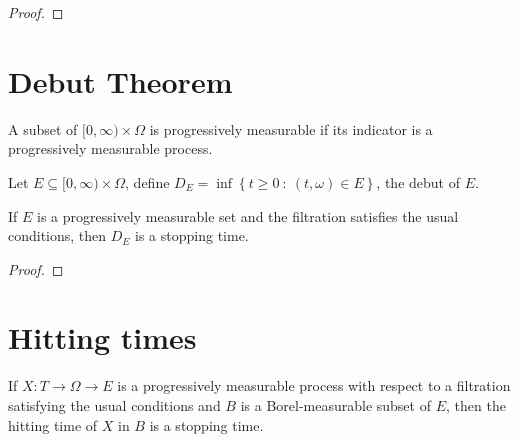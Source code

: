 \begin{proof}\leanok

\end{proof}




\section{Debut Theorem}


\begin{definition}\label{def:progr_meas_set}
  \leanok
A subset of $[0, \infty) \times \Omega$ is progressively measurable if its indicator is a progressively measurable process.
\end{definition}


\begin{definition}\label{def:debut_set}
  \leanok
Let $E \subseteq{} [0, \infty) \times \Omega $, define $D_E = \inf\left\lbrace t \geq 0\ :\ (t, \omega) \in E\right\rbrace$, the debut of $E$.
\end{definition}


\begin{theorem}\label{thm:debut_of_progr_meas_is_stop_time}
  \leanok
If $E$ is a progressively measurable set and the filtration satisfies the usual conditions, then $D_E$ is a stopping time.
\end{theorem}

\begin{proof}\leanok

\end{proof}




\section{Hitting times}

\begin{theorem}\label{thm:hitting_is_stopping_time}
  \leanok
If $X : T \to \Omega \to E$ is a progressively measurable process with respect to a filtration satisfying the usual conditions and $B$ is a Borel-measurable subset of $E$, then the hitting time of $X$ in $B$ is a stopping time.
\end{theorem}

